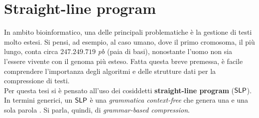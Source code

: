 \section{Straight-line program}
\label{slpsec}
In ambito bioinformatico, una delle principali problematiche è la
gestione di testi molto estesi. Si pensi, ad esempio, al caso umano, dove il
primo cromosoma, il più lungo, conta circa $247.249.719$
\textit{pb} (paia di basi), nonostante l'uomo
non sia l'essere vivente con il genoma più esteso. Fatta questa breve
premessa, è facile comprendere l'importanza degli algoritmi e delle strutture
dati per la compressione di testi.\\
Per questa tesi si è pensato all'uso dei cosiddetti \textbf{straight-line
  program} ($\mbox{\rm {\sf SLP}}$). In termini 
generici, un $\mbox{\rm {\sf SLP}}$ è una \textit{grammatica context-free} che 
genera una e una sola parola \cite{slpsurvey}. Si parla, quindi, di
\textit{grammar-based compression}.
